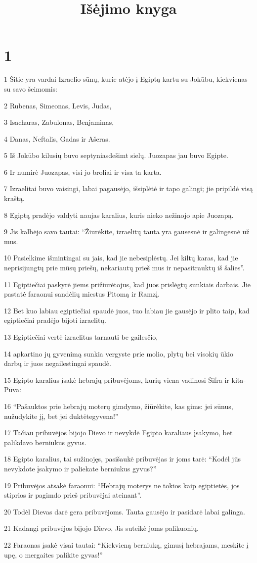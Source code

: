 

\title{Išėjimo knyga}


\chapter{1}


\par 1 Šitie yra vardai Izraelio sūnų, kurie atėjo į Egiptą kartu su Jokūbu, kiekvienas su savo šeimomis: 
\par 2 Rubenas, Simeonas, Levis, Judas, 
\par 3 Isacharas, Zabulonas, Benjaminas, 
\par 4 Danas, Neftalis, Gadas ir Ašeras. 
\par 5 Iš Jokūbo kilusių buvo septyniasdešimt sielų. Juozapas jau buvo Egipte. 
\par 6 Ir numirė Juozapas, visi jo broliai ir visa ta karta. 
\par 7 Izraelitai buvo vaisingi, labai pagausėjo, išsiplėtė ir tapo galingi; jie pripildė visą kraštą. 
\par 8 Egiptą pradėjo valdyti naujas karalius, kuris nieko nežinojo apie Juozapą. 
\par 9 Jis kalbėjo savo tautai: “Žiūrėkite, izraelitų tauta yra gausesnė ir galingesnė už mus. 
\par 10 Pasielkime išmintingai su jais, kad jie nebesiplėstų. Jei kiltų karas, kad jie neprisijungtų prie mūsų priešų, nekariautų prieš mus ir nepasitrauktų iš šalies”. 
\par 11 Egiptiečiai paskyrė jiems prižiūrėtojus, kad juos prislėgtų sunkiais darbais. Jie pastatė faraonui sandėlių miestus Pitomą ir Ramzį. 
\par 12 Bet kuo labiau egiptiečiai spaudė juos, tuo labiau jie gausėjo ir plito taip, kad egiptiečiai pradėjo bijoti izraelitų. 
\par 13 Egiptiečiai vertė izraelitus tarnauti be gailesčio, 
\par 14 apkartino jų gyvenimą sunkia vergyste prie molio, plytų bei visokių ūkio darbų ir juos negailestingai spaudė. 
\par 15 Egipto karalius įsakė hebrajų pribuvėjoms, kurių viena vadinosi Šifra ir kita­Pūva: 
\par 16 “Pašauktos prie hebrajų moterų gimdymo, žiūrėkite, kas gims: jei sūnus, nužudykite jį, bet jei duktė­tegyvena!” 
\par 17 Tačiau pribuvėjos bijojo Dievo ir nevykdė Egipto karaliaus įsakymo, bet palikdavo berniukus gyvus. 
\par 18 Egipto karalius, tai sužinojęs, pasišaukė pribuvėjas ir joms tarė: “Kodėl jūs nevykdote įsakymo ir paliekate berniukus gyvus?” 
\par 19 Pribuvėjos atsakė faraonui: “Hebrajų moterys ne tokios kaip egiptietės, jos stiprios ir pagimdo prieš pribuvėjai ateinant”. 
\par 20 Todėl Dievas darė gera pribuvėjoms. Tauta gausėjo ir pasidarė labai galinga. 
\par 21 Kadangi pribuvėjos bijojo Dievo, Jis suteikė joms palikuonių. 
\par 22 Faraonas įsakė visai tautai: “Kiekvieną berniuką, gimusį hebrajams, meskite į upę, o mergaites palikite gyvas!”


